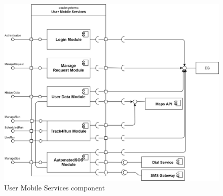\begin{figure}[H]

    \centering
    \includegraphics[scale=0.2]{./Pictures/userServicesDiagram.png}
    \caption{User Mobile Services component}
    
\end{figure}

